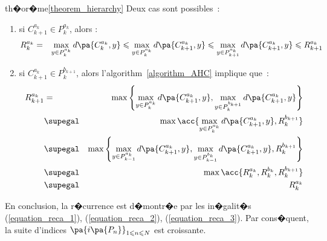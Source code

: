 \begin{xdemo}{th�or�me}{\ref{theorem_hierarchy}}
Deux cas sont possibles~:

\begin{enumerate}
\item si $C_{k+1}^{a_k} \in P_{k}^{a_{k}}$, alors :
    \begin{eqnarray}
    R_k^{a_k}   &=&         \underset{y \in P_{k}^{a_{k}}}{\max} \, d\pa{C_{k}^{a_k},y} %
                \leqslant  \underset{y \in P_{k}^{a_{k}}}{\max} \, d\pa{C_{k+1}^{a_k},y} 
                \leqslant  \underset{y \in P_{k+1}^{a_{k}}}{\max} \, d\pa{C_{k+1}^{a_k},y} %
                \leqslant  R_{k+1}^{a_k} \label{equation_reca_2}
    \end{eqnarray}
\item si $C_{k+1}^{a_k} \in P_{k}^{b_{k+1}}$, alors l'algorithm~\ref{algorithm_AHC} implique que~:
    \begin{eqnarray}
    R_{k+1}^{a_k}   &=&         \max \Bigg\{  
                                                            \underset{y \in P_{k}^{a_{k}}}{\max} \, d\pa{C_{k+1}^{a_k},y} , %
                                \underset{y \in P_{k}^{b_{k+1}}}{\max} \, d\pa{C_{k+1}^{a_k},y} 
                                \Bigg \}\nonumber\\
                    &\supegal&  \max \acc{  \underset{y \in P_{k}^{a_{k}}}{\max} \, 
                                                                d\pa{C_{k+1}^{a_k},y} , R_k^{b_{k+1}} }\nonumber\\
                    &\supegal&  \max \Bigg\{  \underset{y \in P_{k-1}^{a_{k}}}{\max} \, 
                                                                d\pa{C_{k+1}^{a_k},y} , 
                                            \underset{y \in P_{k-1}^{b_{k}}}{\max} \, d\pa{C_{k+1}^{a_k},y} ,
                                            R_k^{b_{k+1}} \Bigg\}\nonumber\\
                    &\supegal&  \max \acc{  R_k^{a_{k}}  , R_k^{b_{k}} , R_k^{b_{k+1}} }\nonumber\\
                    &\supegal&  R_k^{a_{k}}  \label{equation_reca_3}
    \end{eqnarray}
\end{enumerate}


En conclusion, la r�currence est d�montr�e par les in�galit�s (\ref{equation_reca_1}), (\ref{equation_reca_2}),
(\ref{equation_reca_3}). Par cons�quent, la suite d'indices $\pa{i\pa{P_n}}_{1 \leqslant n \leqslant N}$ est croissante.


\end{xdemo}







